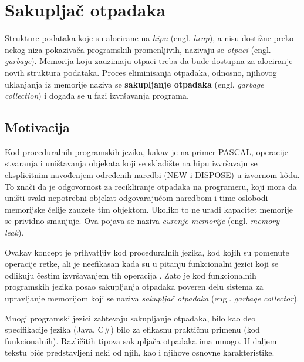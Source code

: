 \section{Sakupljač otpadaka}
\label{sec:djubretar}


Strukture podataka koje su alocirane na \textit{hipu} (engl. \textit{heap}), a nisu dostižne preko nekog niza pokazivača programskih promenljivih, nazivaju se \textit{otpaci} (engl. \textit{garbage}). Memorija koju zauzimaju otpaci treba da bude dostupna za alociranje novih struktura podataka. Proces eliminisanja otpadaka, odnosno, njihovog uklanjanja iz memorije naziva se \textbf{sakupljanje otpadaka} (engl. \textit{garbage collection}) i događa se u fazi izvršavanja programa.

\subsection{Motivacija}

Kod proceduralnih programskih jezika, kakav je na primer PASCAL, operacije stvaranja i uništavanja objekata koji se skladište na hipu izvršavaju se eksplicitnim navođenjem određenih naredbi (NEW i DISPOSE) u izvornom k\^odu. To znači da je odgovornost za recikliranje otpadaka na programeru, koji mora da uništi svaki nepotrebni objekat odgovarajućom naredbom i time oslobodi memorijske ćelije zauzete tim objektom. Ukoliko to ne uradi kapacitet memorije se prividno smanjuje. Ova pojava se naziva \textit{curenje memorije} (engl. \textit{memory leak}).

Ovakav koncept je prihvatljiv kod proceduralnih jezika, kod kojih su pomenute operacije retke, ali je neefikasan kada su u pitanju funkcionalni jezici koji se odlikuju čestim izvršavanjem tih operacija \cite{appel}. Zato je kod funkcionalnih programskih jezika posao sakupljanja otpadaka poveren delu sistema za upravljanje memorijom koji se naziva \textit{sakupljač otpadaka} (engl. \textit{garbage collector}).

Mnogi programski jezici zahtevaju sakupljanje otpadaka, bilo kao deo specifikacije jezika (Java, C\#) bilo za efikasnu praktičnu primenu (kod funkcionalnih). Različitih tipova sakupljača otpadaka ima mnogo. U daljem tekstu biće predstavljeni neki od njih, kao i njihove osnovne karakteristike.

